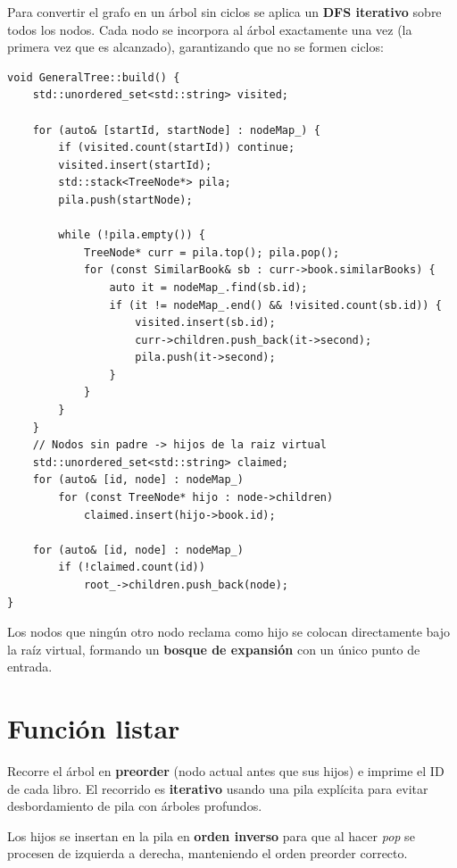 \documentclass[12pt, a4paper]{article}
\begin{document}
Para convertir el grafo en un árbol sin ciclos se aplica un \textbf{DFS iterativo}
sobre todos los nodos. Cada nodo se incorpora al árbol exactamente una vez (la primera
vez que es alcanzado), garantizando que no se formen ciclos:

\begin{lstlisting}
void GeneralTree::build() {
    std::unordered_set<std::string> visited;

    for (auto& [startId, startNode] : nodeMap_) {
        if (visited.count(startId)) continue;
        visited.insert(startId);
        std::stack<TreeNode*> pila;
        pila.push(startNode);

        while (!pila.empty()) {
            TreeNode* curr = pila.top(); pila.pop();
            for (const SimilarBook& sb : curr->book.similarBooks) {
                auto it = nodeMap_.find(sb.id);
                if (it != nodeMap_.end() && !visited.count(sb.id)) {
                    visited.insert(sb.id);
                    curr->children.push_back(it->second);
                    pila.push(it->second);
                }
            }
        }
    }
    // Nodos sin padre -> hijos de la raiz virtual
    std::unordered_set<std::string> claimed;
    for (auto& [id, node] : nodeMap_)
        for (const TreeNode* hijo : node->children)
            claimed.insert(hijo->book.id);

    for (auto& [id, node] : nodeMap_)
        if (!claimed.count(id))
            root_->children.push_back(node);
}
\end{lstlisting}

Los nodos que ningún otro nodo reclama como hijo se colocan directamente bajo la
raíz virtual, formando un \textbf{bosque de expansión} con un único punto de entrada.

\section{Función listar}

Recorre el árbol en \textbf{preorder} (nodo actual antes que sus hijos) e imprime
el ID de cada libro. El recorrido es \textbf{iterativo} usando una pila explícita
para evitar desbordamiento de pila con árboles profundos.

Los hijos se insertan en la pila en \textbf{orden inverso} para que al hacer
\textit{pop} se procesen de izquierda a derecha, manteniendo el orden preorder correcto.
\end{document}
